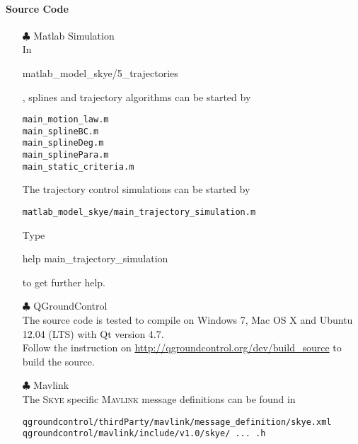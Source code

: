\documentclass[a4paper]{article}
\begin{document}
\paragraph{Source Code}
\begin{itemize}
\item[$\clubsuit$] Matlab Simulation \\
In \begin{scriptsize}matlab\_model\_skye/5\_trajectories\end{scriptsize}, splines and trajectory algorithms can be started by 
\begin{verbatim}
main_motion_law.m
main_splineBC.m
main_splineDeg.m
main_splinePara.m
main_static_criteria.m
\end{verbatim}
The trajectory control simulations can be started by
\begin{verbatim}
matlab_model_skye/main_trajectory_simulation.m
\end{verbatim}
Type \begin{scriptsize}help main\_trajectory\_simulation\end{scriptsize} to get further help. \\

\item[$\clubsuit$] QGroundControl \\
The source code is tested to compile on Windows 7, Mac OS X and Ubuntu 12.04 (LTS) with Qt version 4.7. \\ Follow the instruction on \url{http://qgroundcontrol.org/dev/build_source} to build the source.
\item[$\clubsuit$] Mavlink \\
The \textsc{Skye} specific \textsc{Mavlink} message definitions can be found in
\begin{verbatim}
qgroundcontrol/thirdParty/mavlink/message_definition/skye.xml
qgroundcontrol/mavlink/include/v1.0/skye/ ... .h
\end{verbatim}

\end{itemize}
\end{document}
